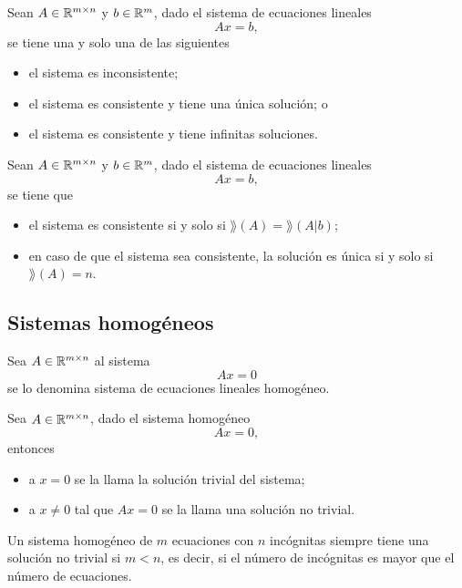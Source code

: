 \documentclass[a4,11pt]{aleph-notas}
\begin{document}
\begin{teo}
    Sean $A\in \Mat[\R]{m}{n}$ y $b\in \R^m$, dado el sistema de ecuaciones lineales
    \[
        Ax=b,
    \]
    se tiene una y solo una de las siguientes
    \begin{itemize}
    \item
        el sistema es inconsistente;
    \item
        el sistema es consistente y tiene una única solución; o
    \item
        el sistema es consistente y tiene infinitas soluciones.
    \end{itemize}
\end{teo}


\begin{teo}
    Sean $A\in \Mat[\R]{m}{n}$ y $b\in \R^m$, dado el sistema de ecuaciones lineales
    \[
        Ax=b,
    \]
    se tiene que
    \begin{itemize}
    \item
        el sistema es consistente si y solo si $\rang(A)=\rang(A|b)$;
    \item
        en caso de que el sistema sea consistente, la solución es única si y solo si $\rang(A)=n$.
    \end{itemize}
\end{teo}

\subsection{Sistemas homogéneos}

\begin{defi}
    Sea $A\in \Mat[\R]{m}{n}$ al sistema
    \[ 
        Ax = 0
    \]
    se lo denomina sistema de ecuaciones lineales homogéneo.
\end{defi}

\begin{defi}
    Sea $A\in \Mat[\R]{m}{n}$, dado el sistema homogéneo
    \[ 
        Ax = 0,
    \]
    entonces
    \begin{itemize}
    \item 
        a $x = 0$ se la llama la solución trivial del sistema;
    \item 
        a $x \neq 0$ tal que $Ax=0$ se la llama una solución no trivial. 
    \end{itemize}
\end{defi}

\begin{teo}
    Un sistema homogéneo de $m$ ecuaciones con $n$ incógnitas siempre tiene una solución no trivial si $m<n$, es decir, si el número de incógnitas es mayor que el número de ecuaciones. 
\end{teo}
\end{document}
